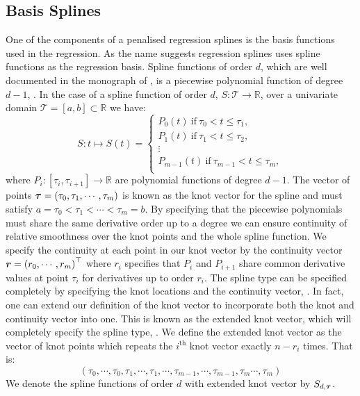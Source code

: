  \subsection{Basis Splines  \label{ssec:basis_splines}}
 One of the components of a penalised regression splines is the basis functions used in the regression.
 As the name suggests regression splines uses spline functions as the regression basis.
 Spline functions of order $d$,  which are well documented in the monograph of \citeauthor{de_boor_practical_2001}, is a piecewise polynomial function of degree $d-1$, \cite{de_boor_practical_2001}. In the case of a spline function of order $d$, $S: \mathcal{T} \to \mathbb{R}$, over a univariate domain $\mathcal{T} = \left[a, b\right] \subset \mathbb{R}$ we have: 
 \begin{equation}
 	S: t \mapsto S(t) = \begin{cases}
 		P_0(t)~\text{if}~ \tau_0 < t  \leq \tau_1,\\
 		P_1(t)~\text{if}~ \tau_1 < t  \leq \tau_2,\\
 		\vdots \\
 		P_{m-1}(t)~\text{if}~ \tau_{m-1} < t  \leq \tau_m,\\
 	\end{cases}
 \end{equation}
where $P_i: \left[\tau_i, \tau_{i+1}\right] \to \mathbb{R}$ are polynomial functions of degree $d-1$.
The vector of points $\bm{{\tau}} = \left(\tau_0, \tau_1, \cdots, \tau_m \right)$ is known as the knot vector for the spline and must satisfy $a=\tau_0 < \tau_1 < \cdots < \tau_m = b$.
By specifying that the piecewise polynomials must share the same derivative order up to a degree we can ensure continuity of relative smoothness over the knot points and the whole spline function.
We specify the continuity at each point in our knot vector by the continuity vector $\bm{{r}}=\left( r_0,\cdots, r_m \right)^\top$ where $r_i$ specifies that $P_i$ and $P_{i+1}$ share common derivative values at point $\tau_i$ for derivatives up to order $r_i$.
The spline type can be specified completely by specifying the knot locations and the continuity vector, \citep{de_boor_practical_2001}.
In fact, one can extend our definition of the knot vector to incorporate both the knot and continuity vector into one.
This is known as the extended knot vector, which will completely specify the spline type, \citep{de_boor_practical_2001}.
We define the extended knot vector as the vector of knot points which repeats the $i^\text{th}$ knot vector exactly $n - r_i$ times. That is:
\begin{equation*}
	(\tau_0,\cdots,\tau_0, \tau_1, \cdots, \tau_1 ,\cdots, \tau_{m-1},\cdots, \tau_{m-1}, \tau_m \cdots, \tau_m)
\end{equation*}
We denote the spline functions of order $d$ with extended knot vector by $S_{d, \bm{{\tau}}}$. 

